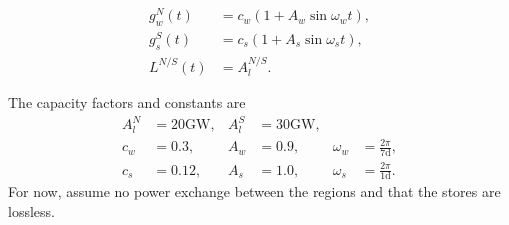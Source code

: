 \documentclass[11pt,a4paper,fleqn]{scrartcl}
\begin{document}
\begin{align*}
 g_{w}^N(t) & = c_w(1+A_w \sin \omega_w t), \\
 g_{s}^S(t) & = c_s(1+A_s \sin \omega_s t), \\
L^{N/S}(t) & = A_{l}^{N/S}.
\end{align*}

The capacity factors and constants are
\begin{align*}
A_{l}^{N} & = 20 \si{\giga\watt}, & A_{l}^{S} & = 30 \si{\giga\watt},                                         \\
 c_w    & = 0.3,                & A_w     & = 0.9,                & \omega_w & = \frac{2\pi}{7 \text{d}}, \\
 c_s    & = 0.12,               & A_s     & = 1.0,                & \omega_s & = \frac{2\pi}{1 \text{d}}.
\end{align*}
\vspace{-0.3em}
For now, assume no power exchange between the regions and that the stores are lossless.
\end{document}
